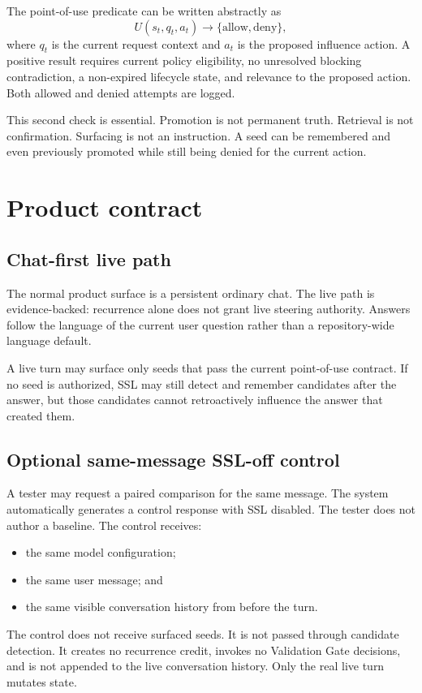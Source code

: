 \documentclass[11pt]{article}
\begin{document}
The point-of-use predicate can be written abstractly as
\begin{equation}
  U(s_t,q_t,a_t) \rightarrow \{\mathrm{allow},\mathrm{deny}\},
\end{equation}
where $q_t$ is the current request context and $a_t$ is the proposed influence action. A positive result requires current policy eligibility, no unresolved blocking contradiction, a non-expired lifecycle state, and relevance to the proposed action. Both allowed and denied attempts are logged.

This second check is essential. Promotion is not permanent truth. Retrieval is not confirmation. Surfacing is not an instruction. A seed can be remembered and even previously promoted while still being denied for the current action.

\section{Product contract}
\label{sec:product}

\subsection{Chat-first live path}

The normal product surface is a persistent ordinary chat. The live path is evidence-backed: recurrence alone does not grant live steering authority. Answers follow the language of the current user question rather than a repository-wide language default.

A live turn may surface only seeds that pass the current point-of-use contract. If no seed is authorized, SSL may still detect and remember candidates after the answer, but those candidates cannot retroactively influence the answer that created them.

\subsection{Optional same-message SSL-off control}

A tester may request a paired comparison for the same message. The system automatically generates a control response with SSL disabled. The tester does not author a baseline. The control receives:
\begin{itemize}[leftmargin=1.5em]
  \item the same model configuration;
  \item the same user message; and
  \item the same visible conversation history from before the turn.
\end{itemize}
The control does not receive surfaced seeds. It is not passed through candidate detection. It creates no recurrence credit, invokes no Validation Gate decisions, and is not appended to the live conversation history. Only the real live turn mutates state.
\end{document}
